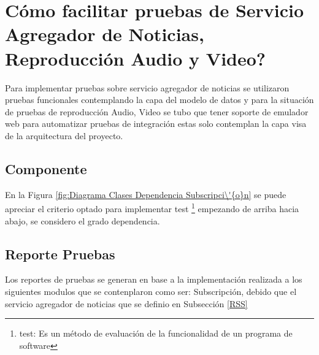 \section{\textquestiondown C\'{o}mo facilitar pruebas de Servicio Agregador de Noticias, Reproducci\'{o}n Audio y Video?}

Para implementar pruebas sobre servicio agregador de noticias se utilizaron pruebas
funcionales contemplando la capa del modelo de datos y para la situaci\'{o}n de pruebas
de reproducci\'{o}n Audio, Video se tubo que tener soporte de emulador web para
automatizar pruebas de integraci\'{o}n estas solo contemplan la capa visa de la arquitectura del proyecto. 

\subsection{Componente}

En la Figura \ref{fig:Diagrama Clases Dependencia Subscripci\'{o}n} se puede
apreciar el criterio optado para implementar test \footnote{test: Es un 
m\'{e}todo de evaluaci\'{o}n de la funcionalidad de un programa de software}
empezando de arriba hacia abajo, se considero el grado dependencia.

\begin{minipage}{1.0\textwidth}
	\centering
	\label{fig:Diagrama Clases Dependencia Subscripci\'{o}n}
\end{minipage}


\subsection{Reporte Pruebas}

Los reportes de pruebas se generan en base a la implementaci\'{o}n realizada a
los siguientes modulos que se contenplaron como ser: Subscripci\'{o}n, debido
que el servicio agregador de noticias que se definio en Subsecci\'{o}n \ref{RSS}

